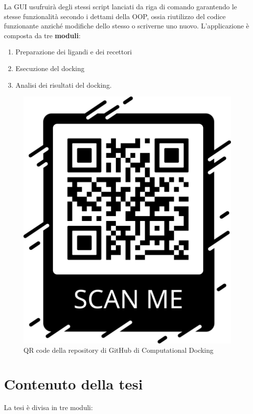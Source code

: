 La GUI usufruirà degli stessi script lanciati da riga di comando garantendo le stesse funzionalità secondo i dettami della OOP, ossia riutilizzo del codice funzionante anziché modifiche dello stesso o scriverne uno nuovo.\newline
L’applicazione è composta da tre \textbf{moduli}:

\begin{enumerate}
    \item Preparazione dei ligandi e dei recettori
    \item Esecuzione del docking
    \item Analisi dei risultati del docking.
\end{enumerate}

\begin{figure}[H]
    \centering
    \includegraphics[scale=0.1]{immagini/capitolo1/QRcode.png}
    \caption{QR code della repository di GitHub di Computational Docking}
    \label{fig:QR code}
\end{figure}

\section{Contenuto della tesi}
La tesi è divisa in tre moduli:

